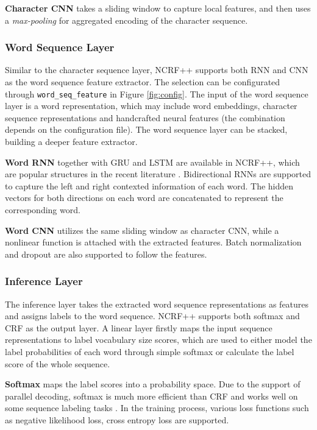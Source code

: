 \documentclass[11pt,a4paper]{article}
\begin{document}
\noindent \textbullet   \textbf{Character CNN} takes a sliding window to capture local features, and then uses a \textit{max-pooling} for aggregated encoding of the character sequence.

\subsubsection{Word Sequence Layer}
Similar to the character sequence layer, NCRF++ supports both RNN and CNN as the word sequence feature extractor. The selection can be configurated through \texttt{word\_seq\_feature} in Figure \ref{fig:config}. The input of the word sequence layer is a word representation, which may include word embeddings, character sequence representations and handcrafted neural features (the combination depends on the configuration file). The word sequence layer can be stacked, building a deeper feature extractor.


\noindent \textbullet  \textbf{Word RNN} together with GRU and LSTM are available in NCRF++, which are popular structures in the recent literature \cite{huang2015bidirectional,lample2016neural,ma2016end,yang2017transfer}. Bidirectional RNNs are supported to capture the left and right contexted information of each word. The hidden vectors for both directions on each word are concatenated to represent the corresponding word.

\noindent \textbullet   \textbf{Word CNN} utilizes the same sliding window as character CNN, while a nonlinear function \cite{glorot2011deep} is attached with the extracted features. Batch normalization \cite{ioffe2015batch} and dropout \cite{srivastava2014dropout} are also supported to follow the features.

\subsubsection{Inference Layer}
The inference layer takes the extracted word sequence representations as features and assigns labels to the word sequence. NCRF++ supports both softmax and CRF as the output layer. A linear layer firstly maps the input sequence representations to label vocabulary size scores, which are used to either model the label probabilities of each word through simple softmax or calculate the label score of the whole sequence.

\noindent \textbullet   \textbf{Softmax} maps the label scores into a probability space. Due to the support of parallel decoding, softmax is much more efficient than CRF and works well on some sequence labeling tasks \cite{ling2015finding}. In the training process, various loss functions such as negative likelihood loss, cross entropy loss are supported.
\end{document}
